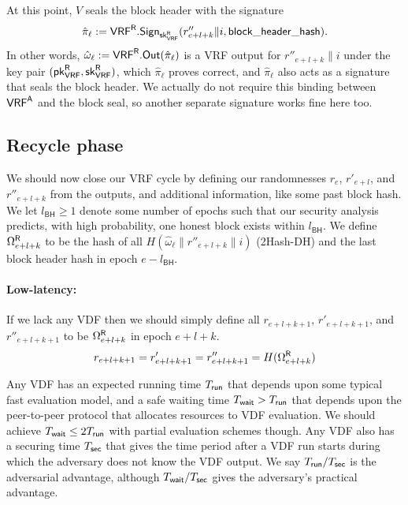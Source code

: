 At this point, $V$ seals the block header with the signature
$$ \hat{\pi}_{\ell} := \mathsf{VRF}^{\mathsf{R}}.\mathsf{Sign}_{\mathsf{sk}_{\mathsf{VRF}}^{\mathsf{R}}}(r''_{e+l+k} \| i, \mathsf{block\_header\_hash}) . $$
In other words, $\hat{\omega}_{\ell} := \mathsf{VRF}^{\mathsf{R}}.\mathsf{Out}(\hat{\pi}_{\ell})$ is a VRF output for $r''_{e+l+k} \| i$ under the key pair $(\mathsf{pk}_{\mathsf{VRF}}^{\mathsf{R}},\mathsf{sk}_{\mathsf{VRF}}^{\mathsf{R}})$, which $\hat{\pi}_{\ell}$ proves correct, and $\hat{\pi}_{\ell}$ also acts as a signature that seals the block header.  We actually do not require this binding between $\mathsf{VRF}^{\mathsf{A}}$ and the block seal, so another separate signature works fine here too.


\subsection{Recycle phase}\label{subsec:recycle_phase}
\newcommand\id{\mathsf{id}}
\newcommand{\epochsdelayforblockhash}{l_{\mathsf{BH}}}
\newcommand{\epochsdelayforVDF}{l_{\mathsf{VDF}}}

We should now close our VRF cycle by defining our randomnesses $r_e$, $r'_{e+l}$, and $r''_{e+l+k}$ from the \VRFr outputs, and additional information, like some past block hash.  We let $\epochsdelayforblockhash \ge 1$ denote some number of epochs such that our security analysis predicts, with high probability, one honest block exists within $\epochsdelayforblockhash$.  We define $\Omega^{\mathsf{R}}_{e+l+k}$ to be the hash of all $H(\hat{\omega}_{\ell} \| r''_{e+l+k} \| i)$ (2Hash-DH) and the last block header hash in epoch $e - \epochsdelayforblockhash$.

\paragraph{Low-latency:} 
If we lack any VDF then we should simply define all $r_{e+l+k+1}$, $r'_{e+l+k+1}$, and $r''_{e+l+k+1}$ to be $\Omega^{\mathsf{R}}_{e+l+k}$ in epoch $e+l+k$.
$$
r_{e+l+k+1} = r'_{e+l+k+1} = r''_{e+l+k+1} = H(\Omega^{\mathsf{R}}_{e+l+k})
$$

Any VDF has an expected running time $T_{\mathsf{run}}$ that depends upon some typical fast evaluation model, and a safe waiting time $T_{\mathsf{wait}} > T_{\mathsf{run}}$ that depends upon the peer-to-peer protocol that allocates resources to VDF evaluation.  We should achieve $T_{\mathsf{wait}} \le 2 T_{\mathsf{run}}$ with partial evaluation schemes though.  Any VDF also has a securing time $T_{\mathsf{sec}}$ that gives the time period after a VDF run starts during which the adversary does not know the VDF output.  We say $T_{\mathsf{run}}/T_{\mathsf{sec}}$ is the adversarial advantage, although $T_{\mathsf{wait}}/T_{\mathsf{sec}}$ gives the adversary's practical advantage.  

